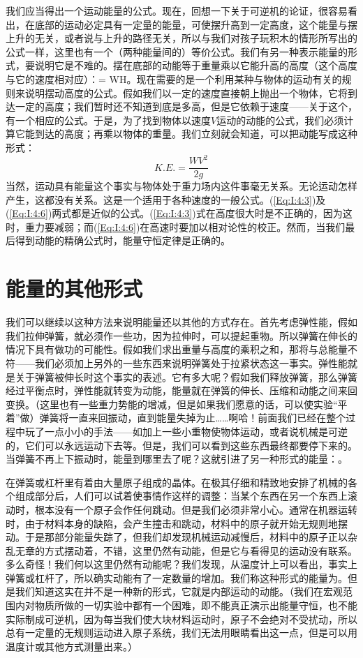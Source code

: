我们应当得出一个运动能量的公式。现在，回想一下关于可逆机的论证，很容易看出，在底部的运动必定具有一定量的能量，可使摆升高到一定高度，这个能量与摆上升的无关，或者说与上升的路径无关，所以与我们对孩子玩积木的情形所写出的公式一样，这里也有一个（两种能量间的）等价公式。我们有另一种表示能量的形式，要说明它是不难的。摆在底部的动能等于重量乘以它能升高的高度（这个高度与它的速度相对应）：= WH。现在需要的是一个利用某种与物体的运动有关的规则来说明摆动高度的公式。假如我们以一定的速度直接朝上抛出一个物体，它将到达一定的高度；我们暂时还不知道到底是多高，但是它依赖于速度——关于这个，有一个相应的公式。于是，为了找到物体以速度$ V $运动的动能的公式，我们必须计算它能到达的高度；再乘以物体的重量。我们立刻就会知道，可以把动能写成这种形式：
\begin{equation}
    \label{Eq:I:4:6}
    K.E.=\frac{WV^2}{2g}
\end{equation}
当然，运动具有能量这个事实与物体处于重力场内这件事毫无关系。无论运动怎样产生，这都没有关系。这是一个适用于各种速度的一般公式。(\ref{Eq:I:4:3})及(\ref{Eq:I:4:6})两式都是近似的公式。(\ref{Eq:I:4:3})式在高度很大时是不正确的，因为这时，重力要减弱；而(\ref{Eq:I:4:6})在高速时要加以相对论性的校正。然而，当我们最后得到动能的精确公式时，能量守恒定律是正确的。


\section{能量的其他形式}

我们可以继续以这种方法来说明能量还以其他的方式存在。首先考虑弹性能，假如我们拉伸弹簧，就必须作一些功，因为拉伸时，可以提起重物。所以弹簧在伸长的情况下具有做功的可能性。假如我们求出重量与高度的乘积之和，那将与总能量不符——我们必须加上另外的一些东西来说明弹簧处于拉紧状态这一事实。弹性能就是关于弹簧被伸长时这个事实的表述。它有多大呢？假如我们释放弹簧，那么弹簧经过平衡点时，弹性能就转变为动能，能量就在弹簧的伸长、压缩和动能之间来回变换。（这里也有一些重力势能的增减，但是如果我们愿意的话，可以使实验“平着”做）弹簧将一直来回振动，直到能量失掉为止……啊哈！前面我们已经在整个过程中玩了一点小小的手法——如加上一些小重物使物体运动，或者说机械是可逆的，它们可以永远运动下去等。但是，我们可以看到这些东西最终都要停下来的。当弹簧不再上下振动时，能量到哪里去了呢？这就引进了另一种形式的能量：。

在弹簧或杠杆里有着由大量原子组成的晶体。在极其仔细和精致地安排了机械的各个组成部分后，人们可以试着使事情作这样的调整：当某个东西在另一个东西上滚动时，根本没有一个原子会作任何跳动。但是我们必须非常小心。通常在机器运转时，由于材料本身的缺陷，会产生撞击和跳动，材料中的原子就开始无规则地摆动。于是那部分能量失踪了，但我们却发现机械运动减慢后，材料中的原子正以杂乱无章的方式摆动着，不错，这里仍然有动能，但是它与看得见的运动没有联系。多么奇怪！我们何以这里仍然有动能呢？我们发现，从温度计上可以看出，事实上弹簧或杠杆了，所以确实动能有了一定数量的增加。我们称这种形式的能量为。但是我们知道这实在并不是一种新的形式，它就是内部运动的动能。（我们在宏观范围内对物质所做的一切实验中都有一个困难，即不能真正演示出能量守恒，也不能实际制成可逆机，因为每当我们使大块材料运动时，原子不会绝对不受扰动，所以总有一定量的无规则运动进入原子系统，我们无法用眼睛看出这一点，但是可以用温度计或其他方式测量出来。）

